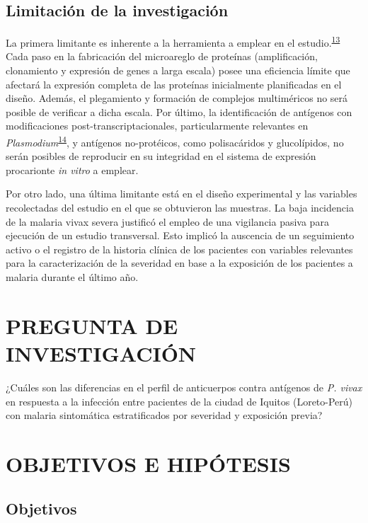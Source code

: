 \documentclass[]{article}
\begin{document}
\subsection{Limitación de la investigación}\label{limit}

La primera limitante es inherente a la herramienta a emplear en el
estudio.\textsuperscript{\protect\hyperlink{ref-vigil2010}{13}} Cada
paso en la fabricación del microareglo de proteínas (amplificación,
clonamiento y expresión de genes a larga escala) posee una eficiencia
límite que afectará la expresión completa de las proteínas inicialmente
planificadas en el diseño. Además, el plegamiento y formación de
complejos multiméricos no será posible de verificar a dicha escala. Por
último, la identificación de antígenos con modificaciones
post-transcriptacionales, particularmente relevantes en
\emph{Plasmodium}\textsuperscript{\protect\hyperlink{ref-leroch2009postmod}{14}},
y antígenos no-protéicos, como polisacáridos y glucolípidos, no serán
posibles de reproducir en su integridad en el sistema de expresión
procarionte \emph{in vitro} a emplear.

Por otro lado, una última limitante está en el diseño experimental y las
variables recolectadas del estudio en el que se obtuvieron las muestras.
La baja incidencia de la malaria vivax severa justificó el empleo de una
vigilancia pasiva para ejecución de un estudio transversal. Esto implicó
la auscencia de un seguimiento activo o el registro de la historia
clínica de los pacientes con variables relevantes para la
caracterización de la severidad en base a la exposición de los pacientes
a malaria durante el último año.

\section{PREGUNTA DE INVESTIGACIÓN}\label{pregunta-de-investigacion}

¿Cuáles son las diferencias en el perfil de anticuerpos contra antígenos
de \emph{P. vivax} en respuesta a la infección entre pacientes de la
ciudad de Iquitos (Loreto-Perú) con malaria sintomática estratificados
por severidad y exposición previa?

\section{OBJETIVOS E HIPÓTESIS}\label{objetivo}

\subsection{Objetivos}\label{objetivos}
\end{document}
